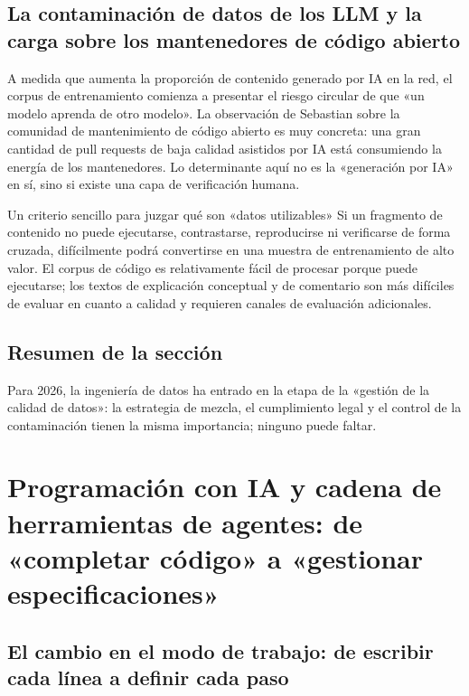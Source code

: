 \documentclass[a4paper]{article}
\begin{document}
\subsection{La contaminación de datos de los LLM y la carga sobre los mantenedores de código abierto}

A medida que aumenta la proporción de contenido generado por IA en la red, el corpus de entrenamiento comienza a presentar el riesgo circular de que «un modelo aprenda de otro modelo». La observación de Sebastian sobre la comunidad de mantenimiento de código abierto es muy concreta: una gran cantidad de pull requests de baja calidad asistidos por IA está consumiendo la energía de los mantenedores. Lo determinante aquí no es la «generación por IA» en sí, sino si existe una capa de verificación humana.

\begin{knowledgebox}{Un criterio sencillo para juzgar qué son «datos utilizables»}
Si un fragmento de contenido no puede ejecutarse, contrastarse, reproducirse ni verificarse de forma cruzada, difícilmente podrá convertirse en una muestra de entrenamiento de alto valor. El corpus de código es relativamente fácil de procesar porque puede ejecutarse; los textos de explicación conceptual y de comentario son más difíciles de evaluar en cuanto a calidad y requieren canales de evaluación adicionales.
\end{knowledgebox}

\subsection{Resumen de la sección}

Para 2026, la ingeniería de datos ha entrado en la etapa de la «gestión de la calidad de datos»: la estrategia de mezcla, el cumplimiento legal y el control de la contaminación tienen la misma importancia; ninguno puede faltar.

\section{Programación con IA y cadena de herramientas de agentes: de «completar código» a «gestionar especificaciones»}

\subsection{El cambio en el modo de trabajo: de escribir cada línea a definir cada paso}
\end{document}
